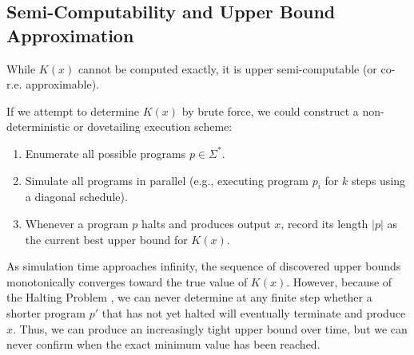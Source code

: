 \subsection{Semi-Computability and Upper Bound Approximation}

While $K(x)$ cannot be computed exactly, it is upper semi-computable (or co-r.e. approximable). 

If we attempt to determine $K(x)$ by brute force, we could construct a non-deterministic or dovetailing execution scheme:
\begin{enumerate}
    \item Enumerate all possible programs $p \in \Sigma^*$.
    \item Simulate all programs in parallel (e.g., executing program $p_i$ for $k$ steps using a diagonal schedule).
    \item Whenever a program $p$ halts and produces output $x$, record its length $\vert{}p\vert{}$ as the current best upper bound for $K(x)$.
\end{enumerate}

As simulation time approaches infinity, the sequence of discovered upper bounds monotonically converges toward the true value of $K(x)$. However, because of the Halting Problem , we can never determine at any finite step whether a shorter program $p'$ that has not yet halted will eventually terminate and produce $x$. Thus, we can produce an increasingly tight upper bound over time, but we can never confirm when the exact minimum value has been reached.